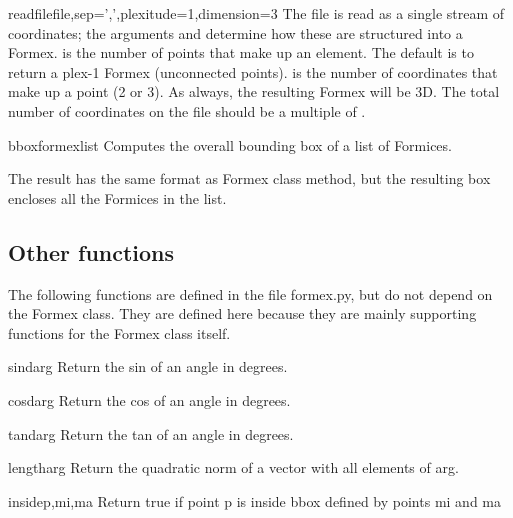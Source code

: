 {{\begin{funcdesc}{readfile}{file,sep=',',plexitude=1,dimension=3}
The file is read as a single stream of coordinates; the arguments  and  determine how these are structured into a Formex.
 is the number of points that make up an element. The default is to return a plex-1 Formex (unconnected points).
 is the number of coordinates that make up a point (2 or 3). As always, the resulting Formex will be 3D.
The total number of coordinates on the file should be a multiple of .
\end{funcdesc}


\begin{funcdesc}{bbox}{formexlist}
Computes the overall bounding box of a list of Formices.

The result has the same format as Formex class  method, but the resulting box encloses all the Formices in the list.
\end{funcdesc}



\subsection{Other functions}
The following functions are defined in the file formex.py, but do not depend on the Formex class. They are defined here because they are mainly supporting functions for the Formex class itself.


\begin{funcdesc}{sind}{arg}
    Return the sin of an angle in degrees.
\end{funcdesc}

\begin{funcdesc}{cosd}{arg}
    Return the cos of an angle in degrees.
\end{funcdesc}

\begin{funcdesc}{tand}{arg}
    Return the tan of an angle in degrees.
\end{funcdesc}

\begin{funcdesc}{length}{arg}
    Return the quadratic norm of a vector with all elements of arg.
\end{funcdesc}

\begin{funcdesc}{inside}{p,mi,ma}
    Return true if point p is inside bbox defined by points mi and ma
\end{funcdesc}


}}
